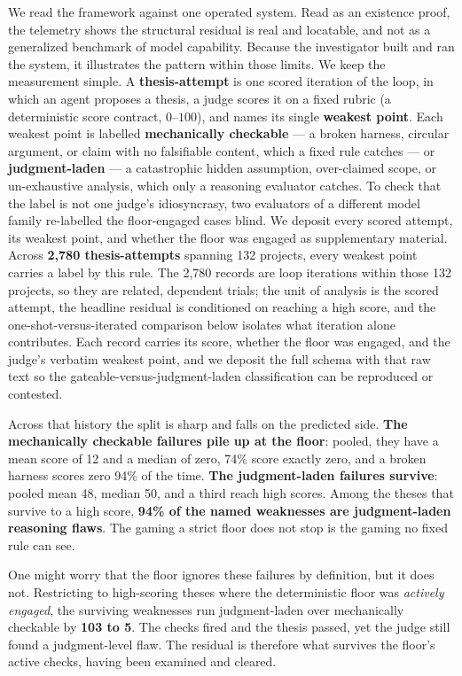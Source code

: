 \documentclass[11pt]{article}
\begin{document}
We read the framework against one operated system. Read as an existence proof, the telemetry shows the structural residual is real and locatable, and not as a generalized benchmark of model capability. Because the investigator built and ran the system, it illustrates the pattern within those limits. We keep the measurement simple. A \textbf{thesis-attempt} is one scored iteration of the loop, in which an agent proposes a thesis, a judge scores it on a fixed rubric (a deterministic score contract, $0$--$100$), and names its single \textbf{weakest point}. Each weakest point is labelled \textbf{mechanically checkable} --- a broken harness, circular argument, or claim with no falsifiable content, which a fixed rule catches --- or \textbf{judgment-laden} --- a catastrophic hidden assumption, over-claimed scope, or un-exhaustive analysis, which only a reasoning evaluator catches. To check that the label is not one judge's idiosyncrasy, two evaluators of a different model family re-labelled the floor-engaged cases blind. We deposit every scored attempt, its weakest point, and whether the floor was engaged as supplementary material. Across \textbf{2,780 thesis-attempts} spanning 132 projects, every weakest point carries a label by this rule. The 2,780 records are loop iterations within those 132 projects, so they are related, dependent trials; the unit of analysis is the scored attempt, the headline residual is conditioned on reaching a high score, and the one-shot-versus-iterated comparison below isolates what iteration alone contributes. Each record carries its score, whether the floor was engaged, and the judge's verbatim weakest point, and we deposit the full schema with that raw text so the gateable-versus-judgment-laden classification can be reproduced or contested.

Across that history the split is sharp and falls on the predicted side. \textbf{The mechanically checkable failures pile up at the floor}: pooled, they have a mean score of 12 and a median of zero, 74\% score exactly zero, and a broken harness scores zero 94\% of the time. \textbf{The judgment-laden failures survive}: pooled mean 48, median 50, and a third reach high scores. Among the theses that survive to a high score, \textbf{94\% of the named weaknesses are judgment-laden reasoning flaws}. The gaming a strict floor does not stop is the gaming no fixed rule can see.

One might worry that the floor ignores these failures by definition, but it does not. Restricting to high-scoring theses where the deterministic floor was \emph{actively engaged}, the surviving weaknesses run judgment-laden over mechanically checkable by \textbf{103 to 5}. The checks fired and the thesis passed, yet the judge still found a judgment-level flaw. The residual is therefore what survives the floor's active checks, having been examined and cleared.
\end{document}
